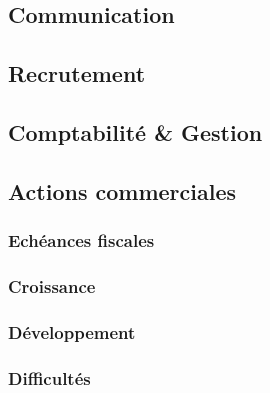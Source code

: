 \documentclass[10pt]{article}
\begin{document}

\subsection{Communication}
\label{sub:communication}


\subsection{Recrutement}
\label{sub:recrutement}


\subsection{Comptabilité \& Gestion}
\label{sub:comptabilité_gestion}


\subsection{Actions commerciales}
\label{sub:actions_commerciales}


\subsubsection{Echéances fiscales}
\label{ssub:echéance_fiscales}

\subsubsection{Croissance}
\label{ssub:croissance}

\subsubsection{Développement}
\label{ssub:developpement}

\subsubsection{Difficultés}
\label{ssub:difficultés}






\end{document}
